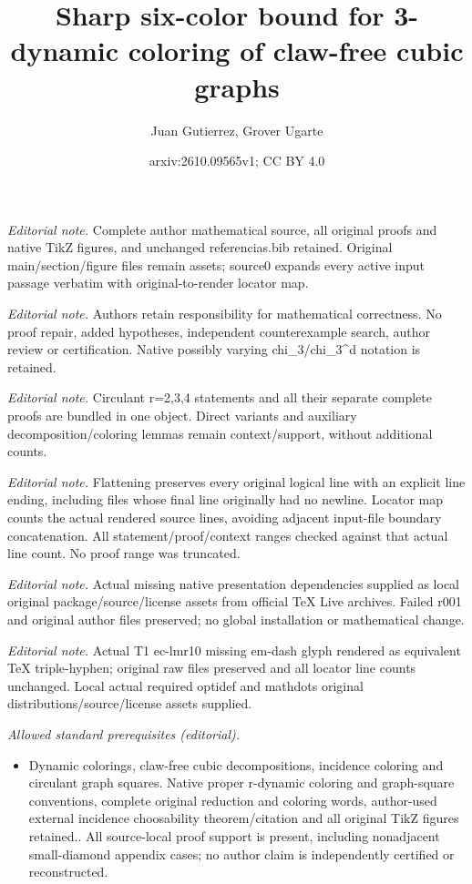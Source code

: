 \documentclass[10pt,a4paper]{article}
\title{Sharp six-color bound for 3-dynamic coloring of claw-free cubic graphs}
\author{Juan Gutierrez, Grover Ugarte}
\date{arxiv:2610.09565v1; CC BY 4.0}
\theoremstyle{case}
\numberwithin{subcase}{case}
\begin{document}
\maketitle
\noindent\textit{Editorial note.} Complete author mathematical source, all original proofs and native TikZ figures, and unchanged referencias.bib retained. Original main/section/figure files remain assets; source0 expands every active input passage verbatim with original-to-render locator map.\par\medskip
\noindent\textit{Editorial note.} Authors retain responsibility for mathematical correctness. No proof repair, added hypotheses, independent counterexample search, author review or certification. Native possibly varying chi\_3/chi\_3\textasciicircum{}d notation is retained.\par\medskip
\noindent\textit{Editorial note.} Circulant r=2,3,4 statements and all their separate complete proofs are bundled in one object. Direct variants and auxiliary decomposition/coloring lemmas remain context/support, without additional counts.\par\medskip
\noindent\textit{Editorial note.} Flattening preserves every original logical line with an explicit line ending, including files whose final line originally had no newline. Locator map counts the actual rendered source lines, avoiding adjacent input-file boundary concatenation. All statement/proof/context ranges checked against that actual line count. No proof range was truncated.\par\medskip
\noindent\textit{Editorial note.} Actual missing native presentation dependencies supplied as local original package/source/license assets from official TeX Live archives. Failed r001 and original author files preserved; no global installation or mathematical change.\par\medskip
\noindent\textit{Editorial note.} Actual T1 ec-lmr10 missing em-dash glyph rendered as equivalent TeX triple-hyphen; original raw files preserved and all locator line counts unchanged. Local actual required optidef and mathdots original distributions/source/license assets supplied.\par\medskip
\noindent\textit{Allowed standard prerequisites (editorial).}\begin{itemize}
\item Dynamic colorings, claw-free cubic decompositions, incidence coloring and circulant graph squares. Native proper r-dynamic coloring and graph-square conventions, complete original reduction and coloring words, author-used external incidence choosability theorem/citation and all original TikZ figures retained.. All source-local proof support is present, including nonadjacent small-diamond appendix cases; no author claim is independently certified or reconstructed.
\end{itemize}\medskip
\end{document}
